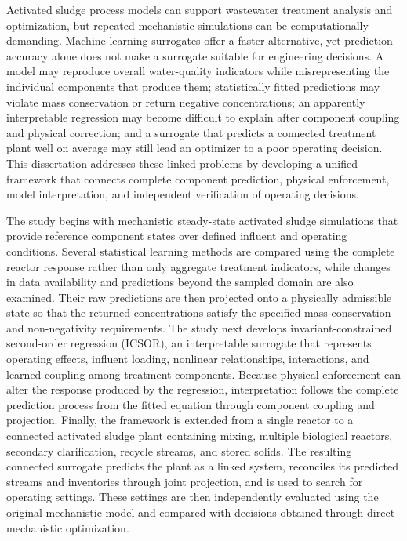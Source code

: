 \documentclass[12pt,twoside]{book}
\begin{document}
Activated sludge process models can support wastewater treatment analysis and optimization, but repeated mechanistic simulations can be computationally demanding. Machine learning surrogates offer a faster alternative, yet prediction accuracy alone does not make a surrogate suitable for engineering decisions. A model may reproduce overall water-quality indicators while misrepresenting the individual components that produce them; statistically fitted predictions may violate mass conservation or return negative concentrations; an apparently interpretable regression may become difficult to explain after component coupling and physical correction; and a surrogate that predicts a connected treatment plant well on average may still lead an optimizer to a poor operating decision. This dissertation addresses these linked problems by developing a unified framework that connects complete component prediction, physical enforcement, model interpretation, and independent verification of operating decisions.

The study begins with mechanistic steady-state activated sludge simulations that provide reference component states over defined influent and operating conditions. Several statistical learning methods are compared using the complete reactor response rather than only aggregate treatment indicators, while changes in data availability and predictions beyond the sampled domain are also examined. Their raw predictions are then projected onto a physically admissible state so that the returned concentrations satisfy the specified mass-conservation and non-negativity requirements. The study next develops invariant-constrained second-order regression (ICSOR), an interpretable surrogate that represents operating effects, influent loading, nonlinear relationships, interactions, and learned coupling among treatment components. Because physical enforcement can alter the response produced by the regression, interpretation follows the complete prediction process from the fitted equation through component coupling and projection. Finally, the framework is extended from a single reactor to a connected activated sludge plant containing mixing, multiple biological reactors, secondary clarification, recycle streams, and stored solids. The resulting connected surrogate predicts the plant as a linked system, reconciles its predicted streams and inventories through joint projection, and is used to search for operating settings. These settings are then independently evaluated using the original mechanistic model and compared with decisions obtained through direct mechanistic optimization.
\end{document}
